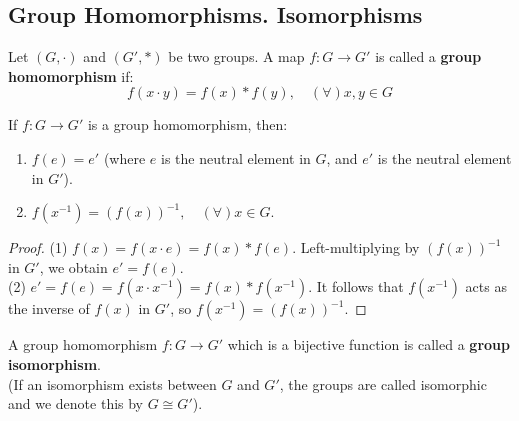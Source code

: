 \subsection*{Group Homomorphisms. Isomorphisms}

\begin{definition}
Let $(G, \cdot)$ and $(G', *)$ be two groups. A map $f: G \rightarrow G'$ is called a \textbf{group homomorphism} if:
$$ f(x \cdot y) = f(x) * f(y), \quad (\forall) x, y \in G $$
\end{definition}

\begin{proposition}[Properties]
If $f: G \rightarrow G'$ is a group homomorphism, then:
\begin{enumerate}
    \item $f(e) = e'$ (where $e$ is the neutral element in $G$, and $e'$ is the neutral element in $G'$).
    \item $f(x^{-1}) = (f(x))^{-1}, \quad (\forall) x \in G$.
\end{enumerate}
\end{proposition}

\begin{proof}
(1) $f(x) = f(x \cdot e) = f(x) * f(e)$. Left-multiplying by $(f(x))^{-1}$ in $G'$, we obtain $e' = f(e)$. \\
(2) $e' = f(e) = f(x \cdot x^{-1}) = f(x) * f(x^{-1})$. It follows that $f(x^{-1})$ acts as the inverse of $f(x)$ in $G'$, so $f(x^{-1}) = (f(x))^{-1}$.
\end{proof}

\begin{definition}
A group homomorphism $f: G \rightarrow G'$ which is a bijective function is called a \textbf{group isomorphism}. \\
(If an isomorphism exists between $G$ and $G'$, the groups are called isomorphic and we denote this by $G \cong G'$).
\end{definition}

